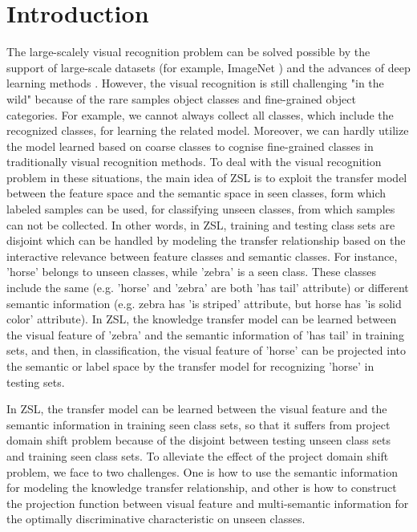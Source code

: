 \documentclass[review]{elsarticle}
\begin{document}
\section{Introduction}
The large-scalely visual recognition problem can be solved possible by the support of large-scale datasets (for example, ImageNet \cite{Russakovsky2015ImageNet}) and the advances of deep learning methods \cite{Krizhevsky2012ImageNet} \cite{Sermanet2013OverFeat} \cite{Simonyan2014Very} \cite{Szegedy2015Going}. However, the visual recognition is still challenging "in the wild" because of the rare samples object classes and fine-grained object categories. For example, we cannot always collect all classes, which include the recognized classes, for learning the related model. Moreover, we can hardly utilize the model learned based on coarse classes to cognise fine-grained classes in traditionally visual recognition methods. To deal with the visual recognition problem in these situations, the main idea of ZSL is to exploit the transfer model between the feature space and the semantic space in seen classes, form which labeled samples can be used, for classifying unseen classes, from which samples can not be collected. In other words, in ZSL, training and testing class sets are disjoint which can be handled by modeling the transfer relationship based on the interactive relevance between feature classes and semantic classes. For instance, 'horse' belongs to unseen classes, while 'zebra' is a seen class. These classes include the same (e.g. 'horse' and 'zebra' are both 'has tail' attribute) or different semantic information (e.g. zebra has 'is striped' attribute, but horse has 'is solid color' attribute). In ZSL, the knowledge transfer model can be learned between the visual feature of 'zebra' and the semantic information of 'has tail' in training sets, and then, in classification, the visual feature of 'horse' can be projected into the semantic or label space by the transfer model for recognizing 'horse' in testing sets.

In ZSL, the transfer model can be learned between the visual feature and the semantic information in training seen class sets, so that it suffers from project domain shift problem \cite{Fu2015Transductive} \cite{Kodirov2017} because of the disjoint between testing unseen class sets and training seen class sets. To alleviate the effect of the project domain shift problem, we face to two challenges\cite{Changpinyo2016}. One is how to use the semantic information for modeling the knowledge transfer relationship, and other is how to construct the projection function between visual feature and multi-semantic information for the optimally discriminative characteristic on unseen classes.
\end{document}
